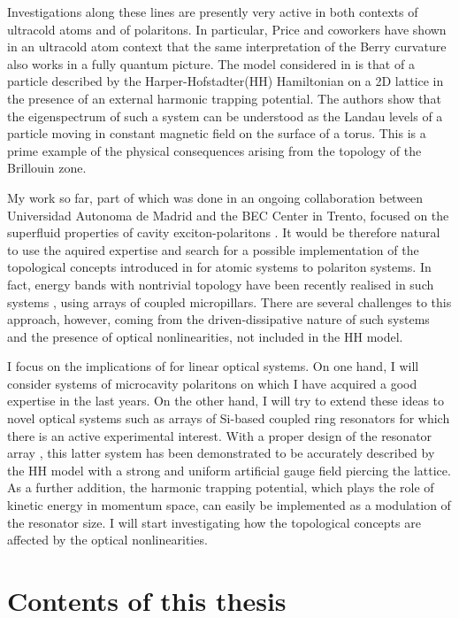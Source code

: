 Investigations along these lines are presently very active 
in both contexts of ultracold atoms and of polaritons. In particular,
Price and coworkers \cite{Price_2014} have shown in an
ultracold atom context that the same interpretation of the Berry
curvature also works in a fully quantum picture. The model considered
in \cite{Price_2014} is that of a particle described by the
Harper-Hofstadter(HH) Hamiltonian on a 2D lattice in the presence of
an external harmonic trapping potential.  The authors show that the
eigenspectrum of such a system can be understood as the Landau levels
of a particle moving in constant magnetic field on the surface of a
torus. This is a prime example of the physical consequences arising
from the topology of the Brillouin zone.

My work so far, part of which was done in an ongoing collaboration
between Universidad Autonoma de Madrid and the BEC Center in Trento,
focused on the superfluid properties of cavity exciton-polaritons
\cite{Berceanu_2012,Tosi_2011}. It would be therefore natural to use the
aquired expertise and search for a possible implementation of the
topological concepts introduced in \cite{Price_2014} for
atomic systems to polariton systems.  In fact, energy bands with
nontrivial topology have been recently realised in such systems
\cite{Jacqmin_2014}, using arrays of coupled micropillars. There are
several challenges to this approach, however, coming from the
driven-dissipative nature of such systems and the presence of optical
nonlinearities, not included in the HH model.


I focus on the implications of \cite{Price_2014} for linear
optical systems. On one hand, I will consider systems of microcavity
polaritons on which I have acquired a good expertise in the last
years.  On the other hand, I will try to extend these ideas to novel
optical systems such as arrays of Si-based coupled ring resonators for
which there is an active experimental interest. With a proper design
of the resonator array \cite{hafezi2013imaging}, this latter system has been
demonstrated to be accurately described by the HH model with a strong
and uniform artificial gauge field piercing the lattice. As a further
addition, the harmonic trapping potential, which plays the role of
kinetic energy in momentum space, can easily be implemented as a
modulation of the resonator size.  I will start investigating how the
topological concepts are affected by the optical nonlinearities.

\section*{Contents of this thesis}










